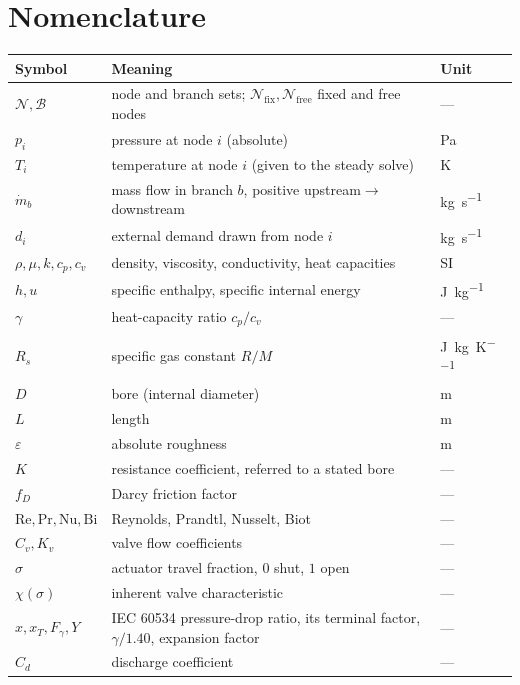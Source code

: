 \documentclass[11pt,a4paper]{article}
\newcommand{\mdot}{\dot{m}}
\newcommand{\Nfix}{\mathcal{N}_{\mathrm{fix}}}
\newcommand{\Nfree}{\mathcal{N}_{\mathrm{free}}}
\begin{document}
\section{Nomenclature}
\begin{center}
\small
\begin{tabular}{lll}
\toprule
Symbol & Meaning & Unit \\
\midrule
$\mathcal{N},\mathcal{B}$ & node and branch sets; $\Nfix,\Nfree$ fixed and free nodes & --- \\
$p_i$ & pressure at node $i$ (absolute) & \si{\pascal} \\
$T_i$ & temperature at node $i$ (given to the steady solve) & \si{\kelvin} \\
$\mdot_b$ & mass flow in branch $b$, positive upstream$\to$downstream & \si{\kilogram\per\second} \\
$d_i$ & external demand drawn from node $i$ & \si{\kilogram\per\second} \\
$\rho,\mu,k,c_p,c_v$ & density, viscosity, conductivity, heat capacities & SI \\
$h,u$ & specific enthalpy, specific internal energy & \si{\joule\per\kilogram} \\
$\gamma$ & heat-capacity ratio $c_p/c_v$ & --- \\
$R_s$ & specific gas constant $R/M$ & \si{\joule\per\kilogram\per\kelvin} \\
$D$ & bore (internal diameter) & \si{\metre} \\
$L$ & length & \si{\metre} \\
$\varepsilon$ & absolute roughness & \si{\metre} \\
$K$ & resistance coefficient, referred to a stated bore & --- \\
$f_D$ & Darcy friction factor & --- \\
$\mathrm{Re},\mathrm{Pr},\mathrm{Nu},\mathrm{Bi}$ & Reynolds, Prandtl, Nusselt, Biot & --- \\
$C_v,K_v$ & valve flow coefficients & --- \\
$\sigma$ & actuator travel fraction, $0$ shut, $1$ open & --- \\
$\chi(\sigma)$ & inherent valve characteristic & --- \\
$x, x_T, F_\gamma, Y$ & IEC 60534 pressure-drop ratio, its terminal factor, $\gamma/1.40$, expansion factor & --- \\
$C_d$ & discharge coefficient & --- \\

\end{tabular}
\end{center}
\end{document}
